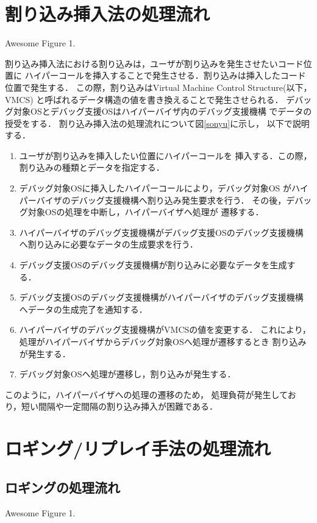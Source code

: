 \documentclass[tanilab-enum]{graduate}
\begin{document}
\section{割り込み挿入法の処理流れ}
{Awesome Figure 1.}

割り込み挿入法における割り込みは，ユーザが割り込みを発生させたいコード位置に
ハイパーコールを挿入することで発生させる．割り込みは挿入したコード位置で発生する．
この際，割り込みはVirtual Machine Control Structure(以下，VMCS)
と呼ばれるデータ構造の値を書き換えることで発生させられる．
デバッグ対象OSとデバッグ支援OSはハイパーバイザ内のデバッグ支援機構
でデータの授受をする．
割り込み挿入法の処理流れについて図\ref{sonyu}に示し，
以下で説明する．
\begin{enumerate}
    \item
        ユーザが割り込みを挿入したい位置にハイパーコールを
        挿入する．この際，割り込みの種類とデータを指定する．

    \item 
        デバッグ対象OSに挿入したハイパーコールにより，デバッグ対象OS
        がハイパーバイザのデバッグ支援機構へ割り込み発生要求を行う．
        その後，デバッグ対象OSの処理を中断し，ハイパーバイザへ処理が
        遷移する．
    \item 
        ハイパーバイザのデバッグ支援機構がデバッグ支援OSのデバッグ支援機構
        へ割り込みに必要なデータの生成要求を行う．
    \item 
        デバッグ支援OSのデバッグ支援機構が割り込みに必要なデータを生成する．
    \item 
        デバッグ支援OSのデバッグ支援機構がハイパーバイザのデバッグ支援機構
        へデータの生成完了を通知する．
    \item 
        ハイパーバイザのデバッグ支援機構がVMCSの値を変更する．
        これにより，処理がハイパーバイザからデバッグ対象OSへ処理が遷移するとき
        割り込みが発生する．
    \item 
        デバッグ対象OSへ処理が遷移し，割り込みが発生する．
\end{enumerate}
このように，ハイパーバイザへの処理の遷移のため，
処理負荷が発生しており，短い間隔や一定間隔の割り込み挿入が困難である．

\section{ロギング/リプレイ手法の処理流れ}
\subsection{ロギングの処理流れ}
{Awesome Figure 1.}
\end{document}
